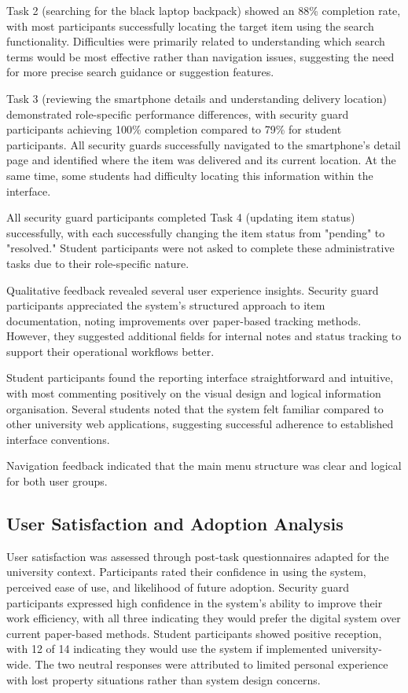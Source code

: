 Task 2 (searching for the black laptop backpack) showed an 88\% completion rate, with most participants successfully locating the target item using the search functionality. Difficulties were primarily related to understanding which search terms would be most effective rather than navigation issues, suggesting the need for more precise search guidance or suggestion features.

Task 3 (reviewing the smartphone details and understanding delivery location) demonstrated role-specific performance differences, with security guard participants achieving 100\% completion compared to 79\% for student participants. All security guards successfully navigated to the smartphone's detail page and identified where the item was delivered and its current location. At the same time, some students had difficulty locating this information within the interface.

All security guard participants completed Task 4 (updating item status) successfully, with each successfully changing the item status from "pending" to "resolved." Student participants were not asked to complete these administrative tasks due to their role-specific nature.

Qualitative feedback revealed several user experience insights. Security guard participants appreciated the system's structured approach to item documentation, noting improvements over paper-based tracking methods. However, they suggested additional fields for internal notes and status tracking to support their operational workflows better.

Student participants found the reporting interface straightforward and intuitive, with most commenting positively on the visual design and logical information organisation. Several students noted that the system felt familiar compared to other university web applications, suggesting successful adherence to established interface conventions.

Navigation feedback indicated that the main menu structure was clear and logical for both user groups.

\subsection{User Satisfaction and Adoption Analysis} \label{subsection:user_satisfaction}

User satisfaction was assessed through post-task questionnaires adapted for the university context. Participants rated their confidence in using the system, perceived ease of use, and likelihood of future adoption. Security guard participants expressed high confidence in the system's ability to improve their work efficiency, with all three indicating they would prefer the digital system over current paper-based methods. Student participants showed positive reception, with 12 of 14 indicating they would use the system if implemented university-wide. The two neutral responses were attributed to limited personal experience with lost property situations rather than system design concerns.

